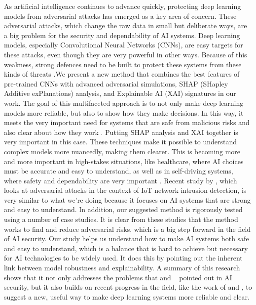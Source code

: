 \documentclass[10pt, conference, a4paper, final]{IEEEtran}
\begin{document}
As artificial intelligence continues to advance quickly, protecting deep learning models
from adversarial attacks has emerged as a key area of concern. These adversarial attacks, 
which change the raw data in small but deliberate ways, are a big problem for the security 
and dependability of AI systems. Deep learning models, especially Convolutional Neural 
Networks (CNNs), are easy targets for these attacks, even though they are very powerful 
in other ways. Because of this weakness, strong defences need to be built to protect these 
systems from these kinds of threats \cite {Akhtar}.We present a new method that combines the best 
features of pre-trained CNNs with advanced adversarial simulations, SHAP (SHapley Additive exPlanations) 
analysis, and Explainable AI (XAI) signatures in our work. The goal of this multifaceted approach is 
to not only make deep learning models more reliable, but also to show how they make decisions. In this way, 
it meets the very important need for systems that are safe from malicious risks and also clear about how they 
work \cite {Lee, Morris, Croce}. Putting SHAP analysis and XAI together is very important in this case. 
These techniques make it possible to understand complex models more nuancedly, making them clearer. 
This is becoming more and more important in high-stakes situations, like healthcare, where AI choices must be 
accurate and easy to understand, as well as in self-driving systems, where safety and dependability are very 
important \cite {Zhou}. Recent study by \cite {Zhou}, which looks at adversarial attacks in the context of IoT network intrusion
detection, is very similar to what we're doing because it focuses on AI systems that are strong and easy to understand.
In addition, our suggested method is rigorously tested using a number of case studies. It is clear from these 
studies that the method works to find and reduce adversarial risks, which is a big step forward in the field of AI security. 
Our study helps us understand how to make AI systems both safe and easy to understand, which is a balance that is hard to achieve 
but necessary for AI technologies to be widely used. It does this by pointing out the inherent link between model robustness and explainability.
A summary of this research shows that it not only addresses the problems that \cite {Akhtar} and \cite {Dong} 
pointed out in AI security, but it also builds on recent progress in the field, like the work of \cite {Morris} and 
\cite {Croce} , to suggest a new, useful way to make deep learning systems more reliable and clear.
\end{document}
